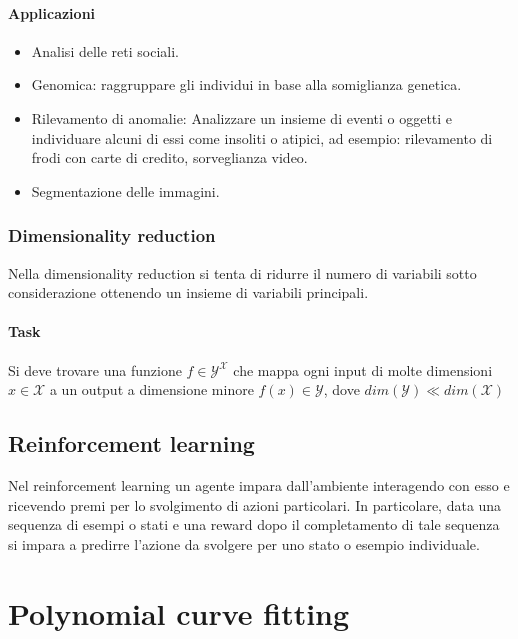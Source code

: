 		\paragraph{Applicazioni}
		\begin{multicols}{2}
			\begin{itemize}
				\item Analisi delle reti sociali.
				\item Genomica: raggruppare gli individui in base alla somiglianza genetica.
				\item Rilevamento di anomalie: Analizzare un insieme di eventi o oggetti e individuare alcuni di essi come insoliti o atipici, ad esempio: rilevamento di frodi con carte di credito, sorveglianza video.
				\item Segmentazione delle immagini.
			\end{itemize}
		\end{multicols}

	\subsubsection{Dimensionality reduction}
	Nella dimensionality reduction si tenta di ridurre il numero di variabili sotto considerazione ottenendo un insieme di variabili principali.

		\paragraph{Task}
		Si deve trovare una funzione $f\in\mathcal{Y}^\mathcal{X}$ che mappa ogni input di molte dimensioni $x\in\mathcal{X}$ a un output a dimensione minore $f(x)\in\mathcal{Y}$, dove $dim(\mathcal{Y})\ll dim(\mathcal{X})$

	\subsection{Reinforcement learning}
	Nel reinforcement learning un agente impara dall'ambiente interagendo con esso e ricevendo premi per lo svolgimento di azioni particolari.
	In particolare, data una sequenza di esempi o stati e una reward dopo il completamento di tale sequenza si impara a predirre l'azione da svolgere per uno stato o esempio individuale.

\section{Polynomial curve fitting}

